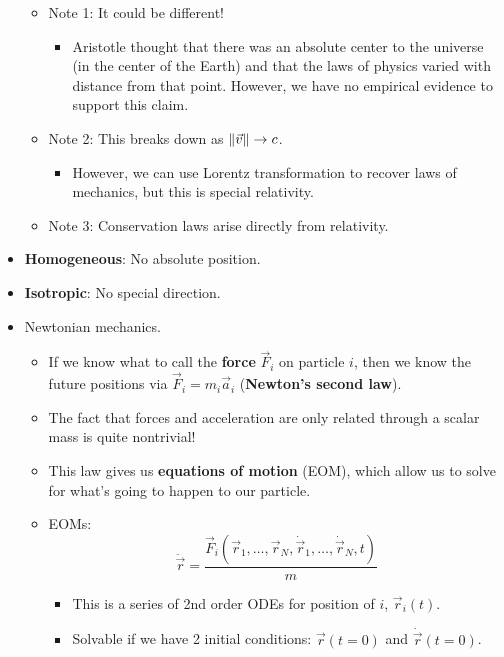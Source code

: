 \documentclass[../notes.tex]{subfiles}
\begin{document}
\begin{itemize}
\begin{itemize}
        \item Note 1: It could be different!
        \begin{itemize}
            \item Aristotle thought that there was an absolute center to the universe (in the center of the Earth) and that the laws of physics varied with distance from that point. However, we have no empirical evidence to support this claim.
        \end{itemize}
        \item Note 2: This breaks down as $\norm{\vec{v}}\to c$.
        \begin{itemize}
            \item However, we can use Lorentz transformation to recover laws of mechanics, but this is special relativity.
        \end{itemize}
        \item Note 3: Conservation laws arise directly from relativity.
    \end{itemize}
    \item \textbf{Homogeneous}: No absolute position.
    \item \textbf{Isotropic}: No special direction.
    \item Newtonian mechanics.
    \begin{itemize}
        \item If we know what to call the \textbf{force} $\vec{F}_i$ on particle $i$, then we know the future positions via $\vec{F}_i=m_i\vec{a}_i$ (\textbf{Newton's second law}).
        \item The fact that forces and acceleration are only related through a scalar mass is quite nontrivial!
        \item This law gives us \textbf{equations of motion} (EOM), which allow us to solve for what's going to happen to our particle.
        \item EOMs:
        \begin{equation*}
            \ddot{\vec{r}} = \frac{\vec{F}_i(\vec{r}_1,\dots,\vec{r}_N,\dot{\vec{r}}_1,\dots,\dot{\vec{r}}_N,t)}{m}
        \end{equation*}
        \begin{itemize}
            \item This is a series of 2nd order ODEs for position of $i$, $\vec{r}_i(t)$.
            \item Solvable if we have 2 initial conditions: $\vec{r}(t=0)$ and $\dot{\vec{r}}(t=0)$.
        \end{itemize}

\end{itemize}
\end{itemize}
\end{document}
